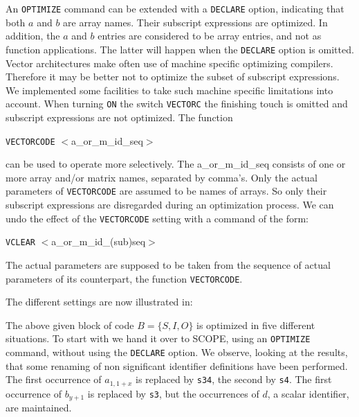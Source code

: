 An {\tt OPTIMIZE} command can be extended with a {\tt DECLARE} option, 
indicating that both $a$ and $b$ are array names. Their subscript expressions
are optimized. In addition, the $a$ and $b$ entries are considered to be
array entries, and not as function applications. The latter will happen when
the {\tt DECLARE} option is omitted. Vector architectures make often use of
machine specific optimizing compilers. Therefore it may be better not to 
optimize the subset of subscript expressions. We implemented some facilities 
to take such machine specific limitations into account.  When turning {\tt ON}
the switch {\tt VECTORC} the finishing touch is omitted and subscript 
expressions are not optimized. The function

\hspace*{1cm} {\tt VECTORCODE} $<$a\_or\_m\_id\_seq$>$

can be used to operate more selectively. The a\_or\_m\_id\_seq consists of
one or more array and/or matrix names, separated by comma's. Only the
actual parameters of {\tt VECTORCODE} are assumed to be  names of arrays. So
only their subscript expressions are disregarded during an optimization
process. We can undo the effect of the {\tt VECTORCODE} setting with a
command of the form:

\hspace*{1cm} {\tt VCLEAR} $<$a\_or\_m\_id\_(sub)seq$>$

The actual parameters are supposed to be taken from the sequence of actual
parameters of its counterpart, the function {\tt VECTORCODE}.

The different settings are now illustrated in:

\example\label{ex:7.1}

The above given block of code $B = \{ S, I, O \}$ is optimized in five
different situations. To start with we hand it over to SCOPE, using an
{\tt OPTIMIZE} command, without using the {\tt DECLARE} option.
We observe, looking at the results, that some renaming of non significant 
identifier
definitions have been performed. The first occurrence of $a_{1,1+x}$ is replaced
by {\tt s34}, the second by  {\tt s4}. The first occurrence of $b_{y+1}$ is
replaced by {\tt s3}, but the occurrences of $d$, a scalar identifier,
are maintained.  


